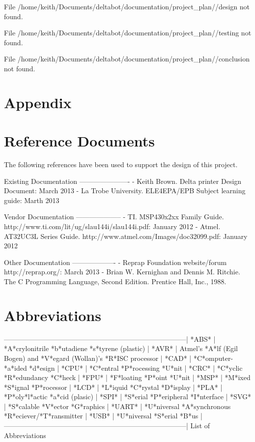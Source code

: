 \documentclass[a4paper, 11pt, oneside]{Thesis}  %
\begin{document}
\clearpage  %



\tableofcontents  %



\mainmatter
\pagestyle{fancy}

{\color{red}File /home/keith/Documents/deltabot/documentation/project\_plan//design not found.}

{\color{red}File /home/keith/Documents/deltabot/documentation/project\_plan//testing not found.}

{\color{red}File /home/keith/Documents/deltabot/documentation/project\_plan//conclusion not found.}

\section{Appendix}

\section{Reference Documents}

The following references have been used to support the design of this project.

Existing Documentation
----------------------
- Keith Brown. Delta printer Design Document: March 2013
- La Trobe University. ELE4EPA/EPB Subject learning guide: Marth 2013

Vendor Documentation
--------------------
- TI. MSP430x2xx Family Guide.  http://www.ti.com/lit/ug/slau144i/slau144i.pdf: January 2012
- Atmel. AT32UC3L Series Guide. http://www.atmel.com/Images/doc32099.pdf: January 2012

Other Documentation
-------------------
- Reprap Foundation website/forum http://reprap.org/: March 2013
- Brian W. Kernighan and Dennis M. Ritchie. The C Programming Language, Second Edition. Prentice Hall, Inc., 1988.
\section{Abbreviations}

--------------------------------------------------------------------------------|
*ABS*	| *A*crylonitrile *b*utadiene *s*tyrene (plastic)			|
*AVR*	| Atmel's *A*lf (Egil Bogen) and *V*egard (Wollan)'s *R*ISC processor	|
*CAD*	| *C*omputer-*a*ided *d*esign						|
*CPU*	| *C*entral *P*rocessing *U*nit						|
*CRC*	| *C*yclic *R*edundancy *C*heck						|
*FPU*	| *F*loating *P*oint *U*nit						|
*MSP*	| *M*ixed *S*ignal *P*rocessor						|
*LCD*	| *L*iquid *C*rystal *D*isplay						|
*PLA*	| *P*oly*l*actic *a*cid (plasic)					|
*SPI*	| *S*erial *P*eripheral *I*nterface					|
*SVG*	| *S*calable *V*ector *G*raphics					|
*UART*	| *U*niversal *A*synchronous *R*eciever/*T*ransmitter			|
*USB*	| *U*niversal *S*erial *B*us						|
--------------------------------------------------------------------------------|
	List of Abbreviations
\end{document}
